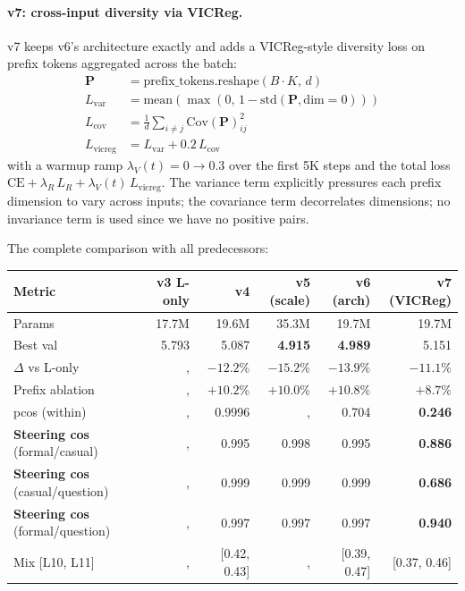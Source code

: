 \documentclass[11pt, a4paper]{article}
\theoremstyle{plain}
\theoremstyle{definition}
\theoremstyle{remark}
\begin{document}
\paragraph{v7: cross-input diversity via VICReg.}
v7 keeps v6's architecture exactly and adds a VICReg-style diversity loss on prefix tokens aggregated across the batch:
\begin{align}
\mathbf{P} &= \mathrm{prefix\_tokens}.\mathrm{reshape}(B{\cdot}K,\, d) \\
L_\text{var} &= \mathrm{mean}\left(\max(0,\, 1 - \mathrm{std}(\mathbf{P},\mathrm{dim}{=}0))\right) \\
L_\text{cov} &= \frac{1}{d}\sum_{i\ne j} \mathrm{Cov}(\mathbf{P})_{ij}^2 \\
L_\text{vicreg} &= L_\text{var} + 0.2\,L_\text{cov}
\end{align}
with a warmup ramp $\lambda_V(t) = 0 \to 0.3$ over the first 5K steps and the total loss $\text{CE} + \lambda_R\,L_R + \lambda_V(t)\,L_\text{vicreg}$.
The variance term explicitly pressures each prefix dimension to vary across inputs; the covariance term decorrelates dimensions; no invariance term is used since we have no positive pairs.

The complete comparison with all predecessors:

\begin{center}
\small
\begin{tabular}{lrrrrr}
\toprule
Metric & v3 L-only & v4 & v5 (scale) & v6 (arch) & v7 (VICReg) \\
\midrule
Params & 17.7M & 19.6M & 35.3M & 19.7M & 19.7M \\
Best val & 5.793 & 5.087 & \textbf{4.915} & \textbf{4.989} & 5.151 \\
$\Delta$ vs L-only & ,  & $-12.2\%$ & $-15.2\%$ & $-13.9\%$ & $-11.1\%$ \\
Prefix ablation & ,  & $+10.2\%$ & $+10.0\%$ & $+10.8\%$ & $+8.7\%$ \\
pcos (within) & ,  & 0.9996 & ,  & 0.704 & \textbf{0.246} \\
\textbf{Steering cos} (formal/casual) & ,  & 0.995 & 0.998 & 0.995 & \textbf{0.886} \\
\textbf{Steering cos} (casual/question) & ,  & 0.999 & 0.999 & 0.999 & \textbf{0.686} \\
\textbf{Steering cos} (formal/question) & ,  & 0.997 & 0.997 & 0.997 & \textbf{0.940} \\
Mix [L10, L11] & ,  & [0.42, 0.43] & ,  & [0.39, 0.47] & [0.37, 0.46] \\
\bottomrule
\end{tabular}
\end{center}
\end{document}
